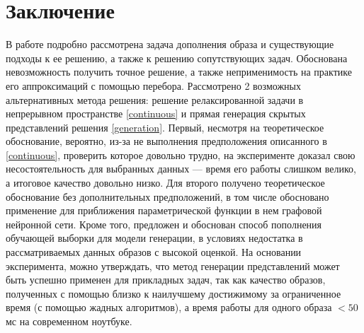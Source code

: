 \documentclass[a4paper,14pt]{extarticle}
\begin{document}
			\section{Заключение}
				В работе подробно рассмотрена задача дополнения образа и существующие подходы к ее решению, а также к решению сопутствующих задач. Обоснована невозможность получить точное решение, а также неприменимость на практике его аппроксимаций с помощью перебора. Рассмотрено 2 возможных альтернативных метода решения:  решение релаксированной задачи в непрерывном пространстве 
				\ref{continuous} и прямая генерация скрытых представлений решения \ref{generation}. Первый, несмотря на теоретическое обоснование, вероятно, из-за не выполнения предположения описанного в \ref{continuous}, проверить которое довольно трудно, на эксперименте 		доказал свою несостоятельность для выбранных данных --- время его работы слишком велико, а итоговое качество довольно низко. Для второго получено теоретическое обоснование без дополнительных предположений, в том числе обосновано применение для приближения параметрической функции в нем графовой нейронной сети. Кроме того, предложен и обоснован способ пополнения обучающей выборки для модели генерации, в условиях недостатка в рассматриваемых данных образов с высокой оценкой. 
				На основании эксперимента, можно утверждать, что метод генерации представлений может быть успешно применен для прикладных задач, так как качество образов, полученных с помощью близко к наилучшему достижимому за ограниченное время (с помощью жадных алгоритмов), а время работы для одного образа $<50$мс на современном ноутбуке.
				
			
	
	
			
	 
\end{document}
